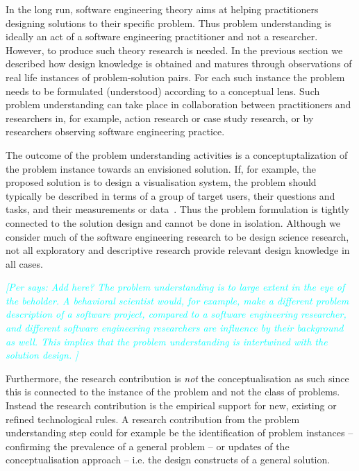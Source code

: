 \documentclass[graybox]{svmult}
\newcommand{\per}[1]{\textcolor{cyan}{{\it [Per says: #1]}}}
\newcommand{\per}[1]{}
\begin{document}
In the long run, software engineering theory aims at helping practitioners designing solutions to their specific problem. Thus problem understanding is ideally an act of a software engineering practitioner and not a researcher. However, to produce such theory research is needed. In the previous section we described how design knowledge is obtained and matures through observations of real life instances of problem-solution pairs. For each such instance the problem needs to be formulated (understood) according to a conceptual lens. Such problem understanding can take place in collaboration between practitioners and researchers in, for example, action research or case study research, or by researchers observing software engineering practice.


The outcome of the problem understanding activities is a conceptuptalization of the problem instance towards an envisioned solution. If, for example, the proposed solution is to design a visualisation system, the problem should typically be described in terms of a group of target users, their questions and tasks, and their measurements or data~\cite{meyer_nested_2015}. Thus the problem formulation is tightly connected to the solution design and cannot be done in isolation. Although we consider much of the software engineering research to be design science research, not all exploratory and descriptive research provide relevant design knowledge in all cases.

\per{Add here? The problem understanding is to large extent in the eye of the beholder. A behavioral scientist would, for example,  make a different problem description of a software project, compared to a software engineering researcher, and different software engineering researchers are influence by their background as well. This implies that the problem understanding is intertwined with the solution design.
}


Furthermore, the research contribution is \emph{not} the conceptualisation as such since this is connected to the instance of the problem and not the class of problems. Instead the research contribution is the empirical support for new, existing or refined technological rules. A research contribution from the problem understanding step could for example be the identification of problem instances -- confirming the prevalence of a general problem -- or updates of the conceptualisation approach -- i.e. the design constructs of a general solution.
\end{document}
